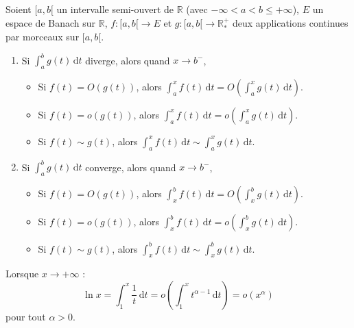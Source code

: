 
  \begin{theorem}
    Soient $[a,b[$ un intervalle semi-ouvert de $\mathbb{R}$ (avec $-\infty < a < b \leq +\infty$), $E$ un espace de Banach sur $\mathbb{R}$, $f : [a,b[ \rightarrow E$ et $g : [a,b[ \rightarrow \mathbb{R}^+_*$ deux applications continues par morceaux sur $[a,b[$.
    \begin{enumerate}[label=(\roman*)]
      \item Si $\int_a^b g(t) \, \mathrm{d}t$ diverge, alors quand $x \rightarrow b^-$,
      \begin{itemize}
        \item Si $f(t) = O(g(t))$, alors $\int_a^x f(t) \, \mathrm{d}t = O\left( \int_a^x g(t) \, \mathrm{d}t \right)$.
        \item Si $f(t) = o(g(t))$, alors $\int_a^x f(t) \, \mathrm{d}t = o\left( \int_a^x g(t) \, \mathrm{d}t \right)$.
        \item Si $f(t) \sim g(t)$, alors $\int_a^x f(t) \, \mathrm{d}t \sim \int_a^x g(t) \, \mathrm{d}t$.
      \end{itemize}
      \item Si $\int_a^b g(t) \, \mathrm{d}t$ converge, alors quand $x \rightarrow b^-$,
      \begin{itemize}
        \item Si $f(t) = O(g(t))$, alors $\int_x^b f(t) \, \mathrm{d}t = O\left( \int_x^b g(t) \, \mathrm{d}t \right)$.
        \item Si $f(t) = o(g(t))$, alors $\int_x^b f(t) \, \mathrm{d}t = o\left( \int_x^b g(t) \, \mathrm{d}t \right)$.
        \item Si $f(t) \sim g(t)$, alors $\int_x^b f(t) \, \mathrm{d}t \sim \int_x^b g(t) \, \mathrm{d}t$.
      \end{itemize}
    \end{enumerate}
  \end{theorem}

  \begin{example}
    Lorsque $x \rightarrow +\infty$ :
    \[ \ln x = \int_1^x \frac{1}{t} \, \mathrm{d}t = o \left( \int_1^x t^{\alpha-1} \, \mathrm{d}t \right) = o(x^\alpha) \]
    pour tout $\alpha > 0$.
  \end{example}

